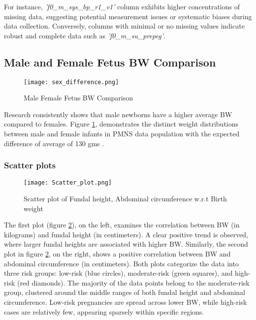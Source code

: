\documentclass[12pt]{article}
\begin{document}
For instance, \textit{'f0\_m\_sys\_bp\_r1\_v1'} column exhibits higher concentrations of missing data, suggesting potential measurement issues or systematic biases during data collection. Conversely, columns with minimal or no missing values indicate robust and complete data such as \textit{'f0\_m\_su\_prepeg'}.

\subsection{Male and Female Fetus BW Comparison}
\begin{figure}[H]
    \centering
    \texttt{[image: sex\_difference.png]} %
    \caption{Male Female Fetus BW Comparison}
    \label{fig:male_female_fetus_bw}
\end{figure}

Research consistently shows that male newborns have a higher average BW compared to females. Figure \ref{fig:male_female_fetus_bw}, demonstrates the distinct weight distributions between male and female infants in PMNS data population with the expected difference of average of 130 gms \cite{28A}. 

\subsubsection{Scatter plots}
\begin{figure}[H]
    \centering
    \texttt{[image: Scatter\_plot.png]} %
    \caption{Scatter plot of Fundal height, Abdominal circumference w.r.t Birth weight}
    \label{fig:scatter_plot}
\end{figure}

The first plot (figure \ref{fig:scatter_plot}), on the left, examines the correlation between BW (in kilograms) and fundal height (in centimeters). A clear positive trend is observed, where larger fundal heights are associated with higher BW. Similarly, the second plot in figure \ref{fig:scatter_plot}, on the right, shows a positive correlation between BW and abdominal circumference (in centimeters). Both plots categorize the data into three risk groups: low-risk (blue circles), moderate-risk (green squares), and high-risk (red diamonds). The majority of the data points belong to the moderate-risk group, clustered around the middle ranges of both fundal height and abdominal circumference. Low-risk pregnancies are spread across lower BW, while high-risk cases are relatively few, appearing sparsely within specific regions.
\end{document}
